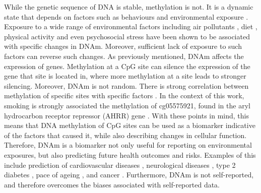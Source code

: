 \documentclass[draft]{article} %
\begin{document}

While the genetic sequence of DNA is stable, methylation is not. It is a dynamic state that depends on factors such as behaviours and environmental exposure \cite{greenberg2019diverse}. Exposure to a wide range of environmental factors including air pollutants \cite{martin2018environmental}, diet \cite{ma2020whole}, physical activity and even psychosocial stress \cite{opsasnick2024epigenome} have been shown to be associated with specific changes in DNAm. Moreover, sufficient lack of exposure to such factors can reverse such changes. As previously mentioned, DNAm affects the expression of genes. Methylation at a CpG site can silence the expression of the gene that site is located in, where more methylation at a site leads to stronger silencing. Moreover, DNAm is not random. There is strong correlation between methylation of specific sites with specific factors \cite{ewasatlas}. In the context of this work, smoking is strongly associated the methylation of cg05575921, found in the aryl hydrocarbon receptor
repressor (AHRR) gene \cite{reynolds2015dna}. With these points in mind, this means that DNA methylation of CpG sites can be used as a biomarker indicative of the factors that caused it, while also describing changes in cellular function. Therefore, DNAm is a biomarker not only useful for reporting on environmental exposures, but also predicting future health outcomes and risks. Examples of this include prediction of cardiovascular diseases \cite{cameron2023dna}, neurological diseases \cite{cells11213439}, type 2 diabetes \cite{cheng2023development}, pace of ageing \cite{10.7554/eLife.73420}, and cancer \cite{luo2020circulating}. Furthermore, DNAm is not self-reported, and therefore overcomes the biases associated with self-reported data.
\end{document}
